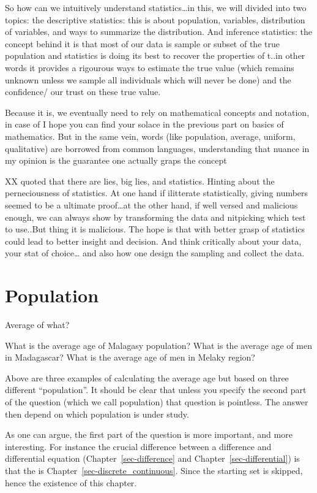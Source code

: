 \documentclass[
  letterpaper,
  DIV=11,
  numbers=noendperiod]{scrreprt}
\begin{document}
So how can we intuitively understand statistics\ldots in this, we will
divided into two topics: the descriptive statistics: this is about
population, variables, distribution of variables, and ways to summarize
the distribution. And inference statistics: the concept behind it is
that most of our data is sample or subset of the true population and
statistics is doing its best to recover the properties of t..in other
words it provides a rigourous ways to estimate the true value (which
remains unknown unless we sample all individuals which will never be
done) and the confidence/ our trust on these true value.

Because it is, we eventually need to rely on mathematical concepts and
notation, in case of I hope you can find your solace in the previous
part on basics of mathematics. But in the same vein, words (like
population, average, uniform, qualitative) are borrowed from common
languages, understanding that nuance in my opinion is the guarantee one
actually graps the concept

XX quoted that there are lies, big lies, and statistics. Hinting about
the perneciousness of statistics. At one hand if ilitterate
statistically, giving numbers seemed to be a ultimate proof\ldots at the
other hand, if well versed and malicious enough, we can always show by
transforming the data and nitpicking which test to use..But thing it is
malicious. The hope is that with better grasp of statistics could lead
to better insight and decision. And think critically about your data,
your stat of choice\ldots{} and also how one design the sampling and
collect the data.

\chapter{Population}\label{sec-population}

Average of what?

What is the average age of Malagasy population? What is the average age
of men in Madagascar? What is the average age of men in Melaky region?

Above are three examples of calculating the average age but based on
three different ``population''. It should be clear that unless you
specify the second part of the question (which we call population) that
question is pointless. The answer then depend on which population is
under study.

As one can argue, the first part of the question is more important, and
more interesting. For instance the crucial difference between a
difference and differential equation (Chapter~\ref{sec-difference} and
Chapter~\ref{sec-differential}) is that the is
Chapter~\ref{sec-discrete_continuous}. Since the starting set is
skipped, hence the existence of this chapter.
\end{document}
